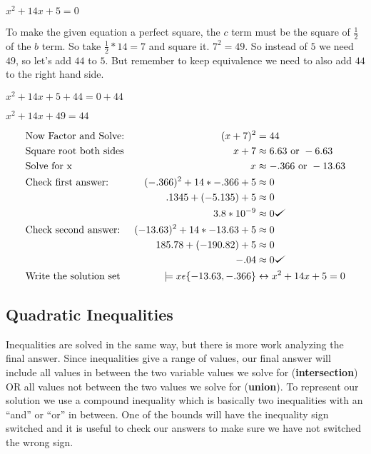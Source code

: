 \documentclass{book}
\theoremstyle{definition}
\def\checkmark{\tikz\fill[scale=0.4](0,.35) -- (.25,0) -- (1,.7) -- (.25,.15) -- cycle;}
\begin{document}
\begin{center}
$x^2+14x+5=0$
\end{center}

To make the given equation a perfect square, the $c$ term must be the square of $\frac{1}{2}$ of the $b$ term. So take $\frac{1}{2} * 14 = 7$ and square it. $7^2=49$. So instead of $5$ we need $49$, so let's add $44$ to $5$. But remember to keep equivalence we need to also add $44$ to the right hand side.
\begin{center}
					$x^2+14x+5+44=0+44$
					
					$x^2+14x+49    = 44$
\end{center}

\begin{align*}\label{(6.12)}
&\text{Now Factor and Solve:}  &(x+7)^2&=44 \\
&\text{Square root both sides} &x+7 &\approx 6.63\text{ or }-6.63 \\
&\text{Solve for x}            &x &\approx -.366\text{ or } -13.63 \\ 
&\text{Check first answer:}  &(-.366)^2+14*-.366+5 &\approx 0 \\
&       &.1345+(-5.135)+5 &\approx 0\\
&       &3.8*10^{-9} &\approx 0 \checkmark{}\\
&\text{Check second answer:}  &(-13.63)^2+14*-13.63+5 &\approx 0 \\
&       &185.78+(-190.82)+5 &\approx 0\\
&       &-.04 &\approx 0 \checkmark{}\\
&\text{Write the solution set}   &\models x\epsilon\{-13.63,-.366\} &\leftrightarrow x^2+14x+5=0
\end{align*}

\subsection{Quadratic Inequalities}

Inequalities are solved in the same way, but there is more work analyzing the final answer. Since inequalities give a range of values, our final answer will include all values in between the two variable values we solve for ({\bf intersection}) OR all values not between the two values we solve for ({\bf union}). To represent our solution we use a compound inequality which is basically two inequalities with an ``and'' or ``or'' in between. One of the bounds will have the inequality sign switched and it is useful to check our answers to make sure we have not switched the wrong sign.
\end{document}
